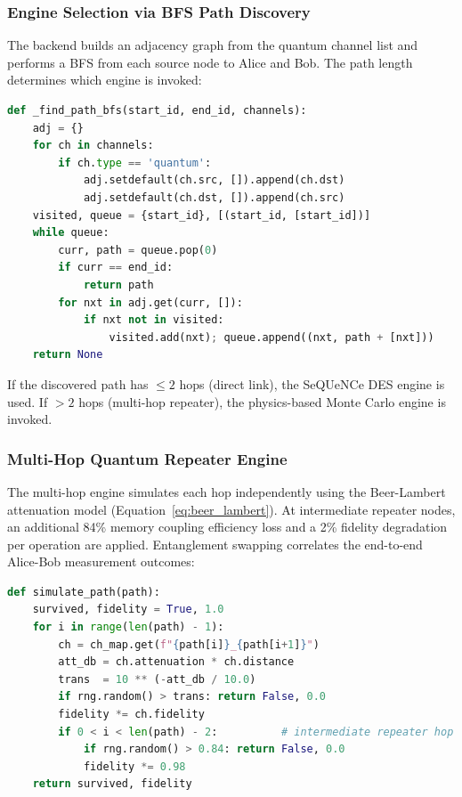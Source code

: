 \documentclass[12pt,oneside,letterpaper,english]{article}
\begin{document}
\subsubsection{Engine Selection via BFS Path Discovery}

The backend builds an adjacency graph from the quantum channel list and performs a BFS from each source node to Alice and Bob. The path length determines which engine is invoked:

\begin{lstlisting}[language=Python, caption={BFS path discovery on quantum channel graph}]
def _find_path_bfs(start_id, end_id, channels):
    adj = {}
    for ch in channels:
        if ch.type == 'quantum':
            adj.setdefault(ch.src, []).append(ch.dst)
            adj.setdefault(ch.dst, []).append(ch.src)
    visited, queue = {start_id}, [(start_id, [start_id])]
    while queue:
        curr, path = queue.pop(0)
        if curr == end_id:
            return path
        for nxt in adj.get(curr, []):
            if nxt not in visited:
                visited.add(nxt); queue.append((nxt, path + [nxt]))
    return None
\end{lstlisting}

If the discovered path has $\leq 2$ hops (direct link), the SeQUeNCe DES engine is used. If $> 2$ hops (multi-hop repeater), the physics-based Monte Carlo engine is invoked.

\subsubsection{Multi-Hop Quantum Repeater Engine}

The multi-hop engine simulates each hop independently using the Beer-Lambert attenuation model (Equation~\ref{eq:beer_lambert}). At intermediate repeater nodes, an additional 84\% memory coupling efficiency loss and a 2\% fidelity degradation per operation are applied. Entanglement swapping correlates the end-to-end Alice-Bob measurement outcomes:

\begin{lstlisting}[language=Python, caption={Per-trial multi-hop chain simulation}]
def simulate_path(path):
    survived, fidelity = True, 1.0
    for i in range(len(path) - 1):
        ch = ch_map.get(f"{path[i]}_{path[i+1]}")
        att_db = ch.attenuation * ch.distance
        trans  = 10 ** (-att_db / 10.0)
        if rng.random() > trans: return False, 0.0
        fidelity *= ch.fidelity
        if 0 < i < len(path) - 2:          # intermediate repeater hop
            if rng.random() > 0.84: return False, 0.0
            fidelity *= 0.98
    return survived, fidelity
\end{lstlisting}
\end{document}
